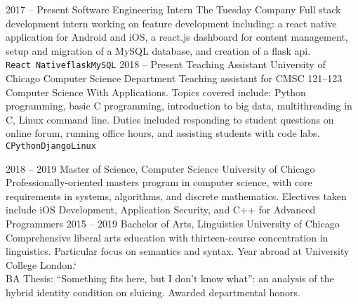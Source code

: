 \documentclass[9pt]{developercv} %
\begin{document}
\begin{entrylist}
	\entry
		{2017 -- Present}
		{Software Engineering Intern}
		{The Tuesday Company}
		{Full stack development intern working on feature development including: a react native application for Android and iOS, a react.js dashboard for content management, setup and migration of a MySQL database, and creation of a flask api. \\ \texttt{React Native}\slashsep\texttt{flask}\slashsep\texttt{MySQL}}
	\entry
		{2018 -- Present}
		{Teaching Assistant}
		{University of Chicago Computer Science Department}
		{Teaching assistant for CMSC 121--123 Computer Science With Applications. Topics covered include: Python programming, basic C programming, introduction to big data, multithreading in C, Linux command line. Duties included responding to student questions on online forum, running office hours, and assisting students with code labs.\\ \texttt{C}\slashsep\texttt{Python}\slashsep\texttt{Django}\slashsep\texttt{Linux}}
	
\end{entrylist}



\begin{entrylist}
	\entry
		{2018 -- 2019}
		{Master of Science, Computer Science}
		{University of Chicago}
		{Professionally-oriented masters program in computer science, with core requirements in systems, algorithms, and discrete mathematics. Electives taken include iOS Development, Application Security, and C++ for Advanced Programmers}
	\entry
		{2015 -- 2019}
		{Bachelor of Arts, Linguistics}
		{University of Chicago}
		{Comprehensive liberal arts education with thirteen-course concentration in linguistics. Particular focus on semantics and syntax. Year abroad at University College London.` \\ BA Thesis: ``Something fits here, but I don't know what'': an analysis of the hybrid identity condition on sluicing. Awarded departmental honors.}

\end{entrylist}

\end{document}
